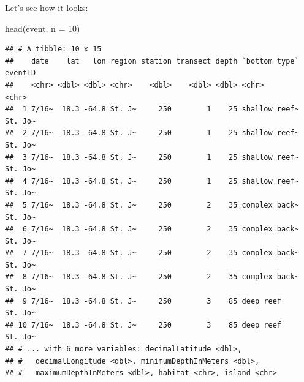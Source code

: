 \documentclass[
]{book}
\newenvironment{Shaded}{\begin{snugshade}}{\end{snugshade}}
\newcommand{\AttributeTok}[1]{\textcolor[rgb]{0.77,0.63,0.00}{#1}}
\newcommand{\DecValTok}[1]{\textcolor[rgb]{0.00,0.00,0.81}{#1}}
\newcommand{\FunctionTok}[1]{\textcolor[rgb]{0.00,0.00,0.00}{#1}}
\newcommand{\NormalTok}[1]{#1}
\newcommand{\OtherTok}[1]{\textcolor[rgb]{0.56,0.35,0.01}{#1}}
\newcommand{\SpecialCharTok}[1]{\textcolor[rgb]{0.00,0.00,0.00}{#1}}
\newcommand{\StringTok}[1]{\textcolor[rgb]{0.31,0.60,0.02}{#1}}
\begin{document}
\begin{Shaded}
\end{Shaded}

Let's see how it looks:

\begin{Shaded}
\begin{Highlighting}[]
\FunctionTok{head}\NormalTok{(event, }\AttributeTok{n =} \DecValTok{10}\NormalTok{)}
\end{Highlighting}
\end{Shaded}

\begin{verbatim}
## # A tibble: 10 x 15
##    date    lat   lon region station transect depth `bottom type` eventID
##    <chr> <dbl> <dbl> <chr>    <dbl>    <dbl> <dbl> <chr>         <chr>  
##  1 7/16~  18.3 -64.8 St. J~     250        1    25 shallow reef~ St. Jo~
##  2 7/16~  18.3 -64.8 St. J~     250        1    25 shallow reef~ St. Jo~
##  3 7/16~  18.3 -64.8 St. J~     250        1    25 shallow reef~ St. Jo~
##  4 7/16~  18.3 -64.8 St. J~     250        1    25 shallow reef~ St. Jo~
##  5 7/16~  18.3 -64.8 St. J~     250        2    35 complex back~ St. Jo~
##  6 7/16~  18.3 -64.8 St. J~     250        2    35 complex back~ St. Jo~
##  7 7/16~  18.3 -64.8 St. J~     250        2    35 complex back~ St. Jo~
##  8 7/16~  18.3 -64.8 St. J~     250        2    35 complex back~ St. Jo~
##  9 7/16~  18.3 -64.8 St. J~     250        3    85 deep reef     St. Jo~
## 10 7/16~  18.3 -64.8 St. J~     250        3    85 deep reef     St. Jo~
## # ... with 6 more variables: decimalLatitude <dbl>,
## #   decimalLongitude <dbl>, minimumDepthInMeters <dbl>,
## #   maximumDepthInMeters <dbl>, habitat <chr>, island <chr>
\end{verbatim}
\end{document}
